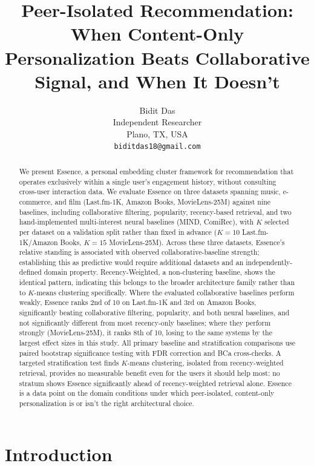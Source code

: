 \documentclass{article}
\title{Peer-Isolated Recommendation: When Content-Only Personalization Beats Collaborative Signal, and When It Doesn't\footnotemark}
\author{%
  Bidit Das \\
  Independent Researcher \\
  Plano, TX, USA \\
  \texttt{biditdas18@gmail.com}
}
\begin{document}
\maketitle
{}

\begin{abstract}
We present Essence, a personal embedding cluster framework for recommendation that operates exclusively within a single user's engagement history, without consulting cross-user interaction data. We evaluate Essence on three datasets spanning music, e-commerce, and film (Last.fm-1K, Amazon Books, MovieLens-25M) against nine baselines, including collaborative filtering, popularity, recency-based retrieval, and two hand-implemented multi-interest neural baselines (MIND, ComiRec), with $K$ selected per dataset on a validation split rather than fixed in advance ($K=10$ Last.fm-1K/Amazon Books, $K=15$ MovieLens-25M). Across these three datasets, Essence's relative standing is associated with observed collaborative-baseline strength; establishing this as predictive would require additional datasets and an independently-defined domain property. Recency-Weighted, a non-clustering baseline, shows the identical pattern, indicating this belongs to the broader architecture family rather than to $K$-means clustering specifically. Where the evaluated collaborative baselines perform weakly, Essence ranks 2nd of 10 on Last.fm-1K and 3rd on Amazon Books, significantly beating collaborative filtering, popularity, and both neural baselines, and not significantly different from most recency-only baselines; where they perform strongly (MovieLens-25M), it ranks 8th of 10, losing to the same systems by the largest effect sizes in this study. All primary baseline and stratification comparisons use paired bootstrap significance testing with FDR correction and BCa cross-checks. A targeted stratification test finds $K$-means clustering, isolated from recency-weighted retrieval, provides no measurable benefit even for the users it should help most: no stratum shows Essence significantly ahead of recency-weighted retrieval alone. Essence is a data point on the domain conditions under which peer-isolated, content-only personalization is or isn't the right architectural choice.
\end{abstract}

\section{Introduction}
\label{sec:intro}
\end{document}
